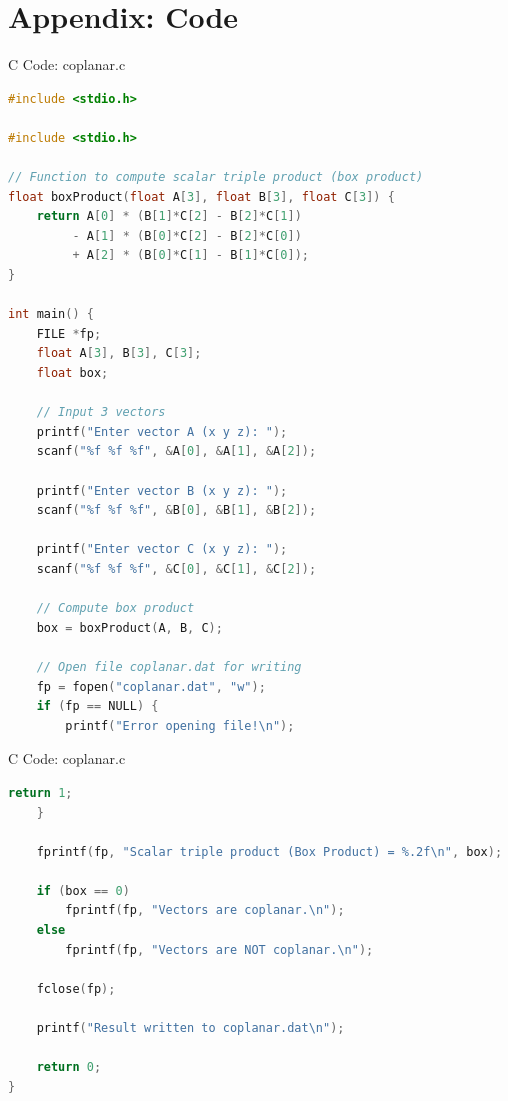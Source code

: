 \documentclass{beamer}
\numberwithin{equation}{section}
\theoremstyle{remark}
\begin{document}
\section*{Appendix: Code}

\begin{frame}[fragile]{C Code: coplanar.c}
\begin{lstlisting}[language=C]
#include <stdio.h>

#include <stdio.h>

// Function to compute scalar triple product (box product)
float boxProduct(float A[3], float B[3], float C[3]) {
    return A[0] * (B[1]*C[2] - B[2]*C[1])
         - A[1] * (B[0]*C[2] - B[2]*C[0])
         + A[2] * (B[0]*C[1] - B[1]*C[0]);
}

int main() {
    FILE *fp;
    float A[3], B[3], C[3];
    float box;

    // Input 3 vectors
    printf("Enter vector A (x y z): ");
    scanf("%f %f %f", &A[0], &A[1], &A[2]);

    printf("Enter vector B (x y z): ");
    scanf("%f %f %f", &B[0], &B[1], &B[2]);

    printf("Enter vector C (x y z): ");
    scanf("%f %f %f", &C[0], &C[1], &C[2]);

    // Compute box product
    box = boxProduct(A, B, C);

    // Open file coplanar.dat for writing
    fp = fopen("coplanar.dat", "w");
    if (fp == NULL) {
        printf("Error opening file!\n");
        \end{lstlisting}
\end{frame}
\begin{frame}[fragile]{C Code: coplanar.c}
\begin{lstlisting}[language=C]
        return 1;
    }

    fprintf(fp, "Scalar triple product (Box Product) = %.2f\n", box);

    if (box == 0)
        fprintf(fp, "Vectors are coplanar.\n");
    else
        fprintf(fp, "Vectors are NOT coplanar.\n");

    fclose(fp);

    printf("Result written to coplanar.dat\n");

    return 0;
}

\end{lstlisting}
\end{frame}
\end{document}
